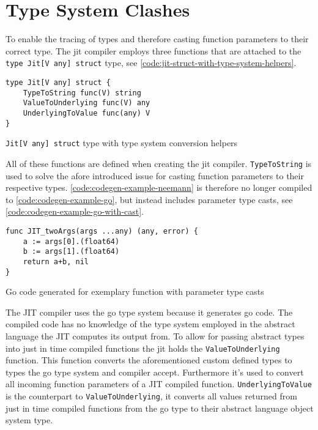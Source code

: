 \section{Type System Clashes}
\label{sec:type-system-clashes}

To enable the tracing of types and therefore casting function parameters to
their correct type. The jit compiler employs three functions that are attached
to the \texttt{type Jit[V any] struct} type, see
\autoref{code:jit-struct-with-type-system-helpers}.

\begin{listing}[H]
    \begin{verbatim}
type Jit[V any] struct {
	TypeToString func(V) string
	ValueToUnderlying func(V) any
	UnderlyingToValue func(any) V
}
    \end{verbatim}
    \caption{\texttt{Jit[V any] struct} type with type system conversion helpers}
    \label{code:jit-struct-with-type-system-helpers}
\end{listing}

All of these functions are defined when creating the jit compiler.
\texttt{TypeToString} is used to solve the afore introduced issue for casting
function parameters to their respective types.
\autoref{code:codegen-example-neemann} is therefore no longer compiled to
\autoref{code:codegen-example-go}, but instead includes parameter type casts,
see \autoref{code:codegen-example-go-with-cast}.

\begin{listing}[H]
    \begin{verbatim}
func JIT_twoArgs(args ...any) (any, error) { 
    a := args[0].(float64)
    b := args[1].(float64)
    return a+b, nil
}
    \end{verbatim}
    \caption{Go code generated for exemplary function with parameter type casts}
    \label{code:codegen-example-go-with-cast}
\end{listing}

The JIT compiler uses the go type system because it generates go code. The
compiled code has no knowledge of the type system employed in the abstract
language the JIT computes its output from. To allow for passing abstract types
into just in time compiled functions the jit holds the
\texttt{ValueToUnderlying} function. This function converts the aforementioned
custom defined types to types the go type system and compiler accept.
Furthermore it's used to convert all incoming function parameters of a JIT
compiled function. \texttt{UnderlyingToValue} is the counterpart to
\texttt{ValueToUnderlying}, it converts all values returned from just in time
compiled functions from the go type to their abstract language object system
type. 


